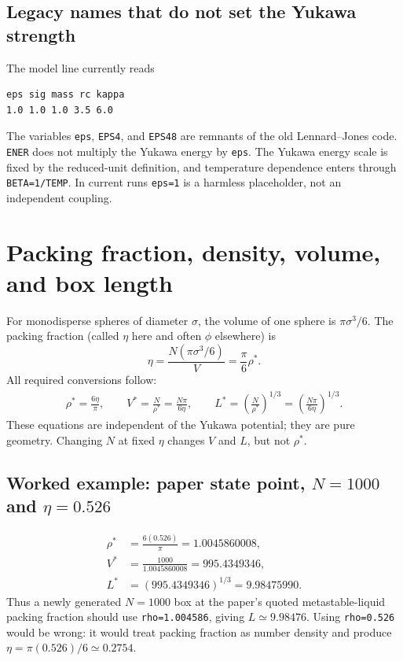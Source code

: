 \documentclass[11pt,a4paper]{article}
\newcommand{\code}[1]{\texttt{#1}}
\begin{document}
\subsection{Legacy names that do not set the Yukawa strength}
The model line currently reads
\begin{verbatim}
eps sig mass rc kappa
1.0 1.0 1.0 3.5 6.0
\end{verbatim}
The variables \code{eps}, \code{EPS4}, and \code{EPS48} are remnants of the
old Lennard--Jones code.  \code{ENER} does not multiply the Yukawa energy by
\code{eps}.  The Yukawa energy scale is fixed by the reduced-unit definition,
and temperature dependence enters through \code{BETA=1/TEMP}.  In current
runs \code{eps=1} is a harmless placeholder, not an independent coupling.

\section{Packing fraction, density, volume, and box length}
For monodisperse spheres of diameter $\sigma$, the volume of one sphere is
$\pi\sigma^3/6$.  The packing fraction (called $\eta$ here and often $\phi$
elsewhere) is
\begin{equation}
 \boxed{\eta=\frac{N(\pi\sigma^3/6)}{V}
 =\frac{\pi}{6}\rho^*.}
\end{equation}
All required conversions follow:
\begin{align}
 \boxed{\rho^*=\frac{6\eta}{\pi}},\qquad
 \boxed{V^*=\frac{N}{\rho^*}=\frac{N\pi}{6\eta}},\qquad
 \boxed{L^*=\left(\frac{N}{\rho^*}\right)^{1/3}
 =\left(\frac{N\pi}{6\eta}\right)^{1/3}}.
 \label{eq:eta-conversions}
\end{align}
These equations are independent of the Yukawa potential; they are pure
geometry.  Changing $N$ at fixed $\eta$ changes $V$ and $L$, but not $\rho^*$.

\subsection{Worked example: paper state point, $N=1000$ and $\eta=0.526$}
\begin{align}
 \rho^*&=\frac{6(0.526)}{\pi}=1.0045860008,\\
 V^*&=\frac{1000}{1.0045860008}=995.4349346,\\
 L^*&=(995.4349346)^{1/3}=9.98475990.
\end{align}
Thus a newly generated $N=1000$ box at the paper's quoted metastable-liquid
packing fraction should use \code{rho=1.004586}, giving $L\simeq9.98476$.
Using \code{rho=0.526} would be wrong: it would treat packing fraction as
number density and produce $\eta=\pi(0.526)/6\simeq0.2754$.
\end{document}
